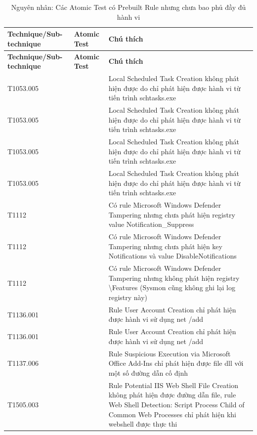 \begingroup
\small
\renewcommand{\arraystretch}{1.12}
\begin{longtable}{|>{\raggedright\arraybackslash}p{3.2cm}|>{\centering\arraybackslash}p{2.0cm}|>{\raggedright\arraybackslash}p{9.1cm}|}
\caption{Nguyên nhân: Các Atomic Test có Prebuilt Rule nhưng chưa bao phủ đầy đủ hành vi}\label{tab:rule-chua-hoan-thien-reasons}\\
\hline
\textbf{Technique/Sub-technique} & \textbf{Atomic Test} & \textbf{Chú thích} \\
\hline
\endfirsthead
\hline
\textbf{Technique/Sub-technique} & \textbf{Atomic Test} & \textbf{Chú thích} \\
\hline
\endhead
\hline
\endfoot
\hline
\endlastfoot
T1053.005 & 4 & Local Scheduled Task Creation không phát hiện được do chỉ phát hiện được hành vi từ tiến trình schtasks.exe \\ \hline
T1053.005 & 6 & Local Scheduled Task Creation không phát hiện được do chỉ phát hiện được hành vi từ tiến trình schtasks.exe \\ \hline
T1053.005 & 8 & Local Scheduled Task Creation không phát hiện được do chỉ phát hiện được hành vi từ tiến trình schtasks.exe \\ \hline
T1053.005 & 9 & Local Scheduled Task Creation không phát hiện được do chỉ phát hiện được hành vi từ tiến trình schtasks.exe \\ \hline
T1112 & 38 & Có rule Microsoft Windows Defender Tampering nhưng chưa phát hiện registry value Notification\_Suppress \\ \hline
T1112 & 51 & Có rule Microsoft Windows Defender Tampering nhưng chưa phát hiện key Notifications và value DisableNotifications \\ \hline
T1112 & 56 & Có rule Microsoft Windows Defender Tampering nhưng không phát hiện registry \textbackslash{}Features (Sysmon cũng không ghi lại log registry này) \\ \hline
T1136.001 & 5 & Rule User Account Creation chỉ phát hiện được hành vi sử dụng net /add \\ \hline
T1136.001 & 9 & Rule User Account Creation chỉ phát hiện được hành vi sử dụng net /add \\ \hline
T1137.006 & 1 & Rule Suspicious Execution via Microsoft Office Add-Ins chỉ phát hiện được file dll với một số đường dẫn cố định \\ \hline
T1505.003 & 1 & Rule Potential IIS Web Shell File Creation không phát hiện được đường dẫn file, rule Web Shell Detection: Script Process Child of Common Web Processes chỉ phát hiện khi webshell được thực thi \\ \hline

\end{longtable}
